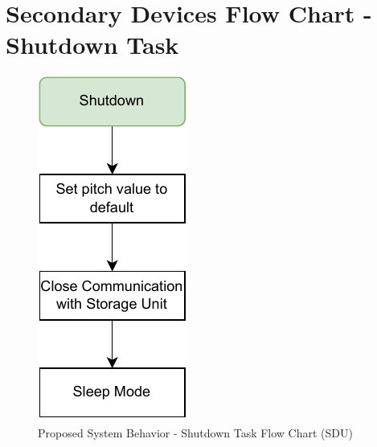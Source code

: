 
\chapter{Secondary Devices Flow Chart - Shutdown Task} %

\label{AppendixH}

\begin{figure}[H]
    \centering
    \includegraphics[scale=1]{appendices/assets/SDU_SHUTDOWN.pdf}
    \caption{Proposed System Behavior - Shutdown Task Flow Chart (SDU)}
    \label{fig:SDU_SHUTDOWN}
\end{figure}

